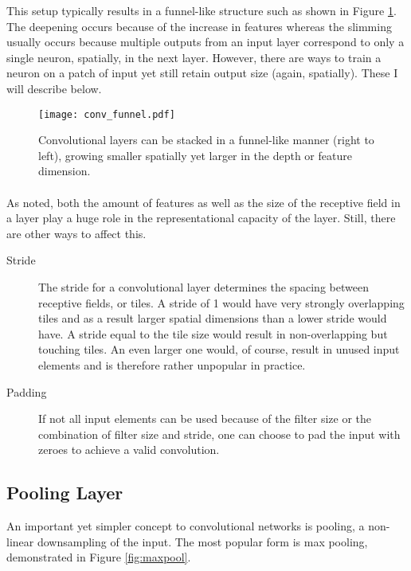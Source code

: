 This setup typically results in a funnel-like structure
such as shown in Figure \ref{fig:conv_layer_funnel}.
The deepening occurs because of the increase in features
whereas the slimming usually occurs because multiple
outputs from an input layer correspond to only a single
neuron, spatially, in the next layer.
However, there are ways to train a neuron on a patch of input
yet still retain output size (again, spatially).
These I will describe below.

\begin{figure}[htpb]
  \centering
  \texttt{[image: conv\_funnel.pdf]}
  \caption[Convolutional layers stacked]{
    Convolutional layers can be stacked
    in a funnel-like manner (right to left),
    growing smaller spatially
    yet larger in the depth or feature dimension.
  }
  \label{fig:conv_layer_funnel}
\end{figure}

\paragraph{}
As noted, both the amount of features
as well as the size of the receptive field in a layer
play a huge role in the representational capacity of the layer.
Still, there are other ways to affect this.
\begin{description}
  \item[Stride]
    The stride for a convolutional layer determines the spacing
    between receptive fields, or tiles.
    A stride of 1 would have very strongly overlapping tiles
    and as a result larger spatial dimensions
    than a lower stride would have.
    A stride equal to the tile size
    would result in non-overlapping but touching tiles.
    An even larger one would, of course,
    result in unused input elements and is therefore
    rather unpopular in practice.
  \item[Padding]
    If not all input elements can be used
    because of the filter size or the combination
    of filter size and stride,
    one can choose to pad the input with zeroes
    to achieve a valid convolution.
\end{description}

\subsection{Pooling Layer}
An important yet simpler concept to
convolutional networks is pooling,
a non-linear downsampling of the input.
The most popular form is max pooling,
demonstrated in Figure \ref{fig:maxpool}.

